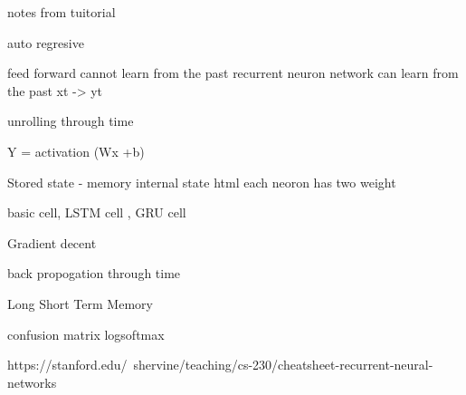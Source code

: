 notes from tuitorial

auto regresive

feed forward cannot learn from the past
recurrent neuron network can learn from the past
xt -> yt 

unrolling through time


Y = activation (Wx +b)


Stored state - memory
internal state html
each neoron has two weight 


basic cell, LSTM cell , GRU cell 

Gradient decent 

back propogation through time

Long Short Term Memory 





confusion matrix
logsoftmax

https://stanford.edu/~shervine/teaching/cs-230/cheatsheet-recurrent-neural-networks